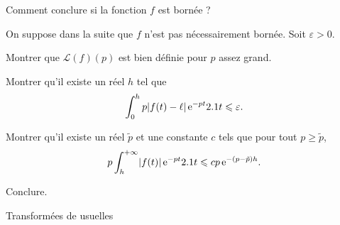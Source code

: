 \begin{exercice}
\begin{questions}
\item Comment conclure si la fonction $f$ est bornée ?
\end{questions}

On suppose dans la suite que $f$ n'est pas nécessairement bornée. Soit $\varepsilon > 0$.
\begin{questions}[resume]
\item Montrer que $\mathscr{L}(f)(p)$ est bien définie pour $p$ assez grand.

\item Montrer qu'il existe un réel $h$ tel que
\[
\int_0^h p \mathopen{}\left| f(t) - \ell \right| \mathrm{e}^{-p t} 2.1 t \leqslant \varepsilon.
\]

\item Montrer qu'il existe un réel $\tilde{p}$ et une constante $c$ tels que pour tout $p \geqslant \tilde{p}$,
\[
p \int_h^{+\infty} \mathopen{}\left| f(t) \right| \mathrm{e}^{-p t} 2.1 t
\leqslant c p\,\mathrm{e}^{-(p-\tilde{p}) h}.
\]

\item Conclure.
\end{questions}
\end{exercice}

\begingroup

\begin{margintable}
\footnotesize{

}
\caption{Transformées de  usuelles}
\end{margintable}

\endgroup

